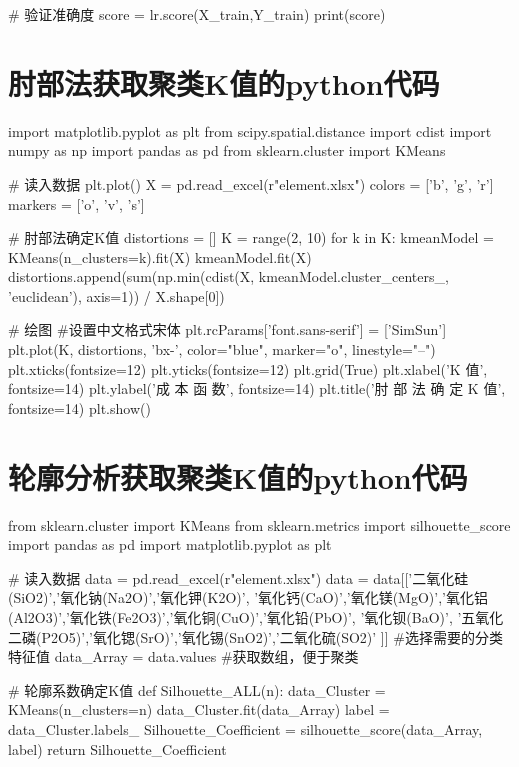 \documentclass[withoutpreface,bwprint]{cumcmthesis} %
\begin{document}
\begin{appendices}
\begin{python}
	# 验证准确度
	score = lr.score(X_train,Y_train)
	print(score)
\end{python}

\section{肘部法获取聚类K值的python代码}

\begin{python}
	import matplotlib.pyplot as plt
	from scipy.spatial.distance import cdist
	import numpy as np
	import pandas as pd
	from sklearn.cluster import KMeans
	
	
	# 读入数据
	plt.plot()
	X = pd.read_excel(r"element.xlsx")
	colors = ['b', 'g', 'r']
	markers = ['o', 'v', 's']
	
	# 肘部法确定K值
	distortions = []
	K = range(2, 10)
	for k in K:
	kmeanModel = KMeans(n_clusters=k).fit(X)
	kmeanModel.fit(X)
	distortions.append(sum(np.min(cdist(X, kmeanModel.cluster_centers_, 'euclidean'), axis=1)) / X.shape[0])
	
	# 绘图
	#设置中文格式宋体
	plt.rcParams['font.sans-serif'] = ['SimSun']
	plt.plot(K, distortions, 'bx-',  color="blue", marker="o", linestyle="--")
	plt.xticks(fontsize=12)
	plt.yticks(fontsize=12)
	plt.grid(True)
	plt.xlabel('K  值', fontsize=14)
	plt.ylabel('成 本 函 数', fontsize=14)
	plt.title('肘 部 法 确 定 K 值', fontsize=14)
	plt.show()
\end{python}

\section{轮廓分析获取聚类K值的python代码}

\begin{python}
	from sklearn.cluster import KMeans
	from sklearn.metrics import silhouette_score
	import pandas as pd
	import matplotlib.pyplot as plt
	
	# 读入数据
	data = pd.read_excel(r"element.xlsx")
	data = data[['二氧化硅(SiO2)','氧化钠(Na2O)','氧化钾(K2O)',	'氧化钙(CaO)','氧化镁(MgO)','氧化铝(Al2O3)','氧化铁(Fe2O3)','氧化铜(CuO)','氧化铅(PbO)', '氧化钡(BaO)', '五氧化二磷(P2O5)','氧化锶(SrO)','氧化锡(SnO2)','二氧化硫(SO2)'
	]]                    #选择需要的分类特征值
	data_Array = data.values           #获取数组，便于聚类
	
	# 轮廓系数确定K值
	def Silhouette_ALL(n):  
	data_Cluster = KMeans(n_clusters=n)
	data_Cluster.fit(data_Array)
	label = data_Cluster.labels_
	Silhouette_Coefficient = silhouette_score(data_Array, label)
	return Silhouette_Coefficient
	

\end{python}
\end{appendices}
\end{document}
